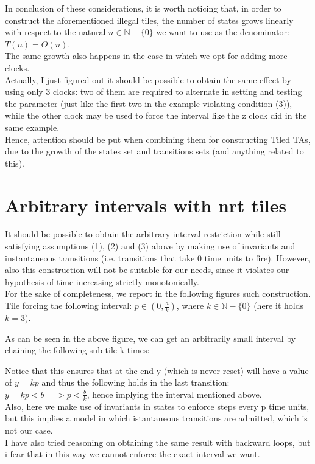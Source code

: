 \documentclass[12pt, a4paper]{article}
\begin{document}
\noindent
In conclusion of these considerations, it is worth noticing that, in order to construct the aforementioned illegal tiles, the number of states grows linearly with respect to the natural $n \in \mathbb{N}-\{0\}$ we want to use as the denominator: $T(n) = \Theta(n)$.\\
The same growth also happens in the case in which we opt for adding more clocks.\\
Actually, I just figured out it should be possible to obtain the same effect by using only 3 clocks: two of them are required to alternate in setting and testing the parameter (just like the first two in the example violating condition (3)), while the other clock may be used to force the interval like the z clock did in the same example.\\
Hence, attention should be put when combining them for constructing Tiled TAs, due to the growth of the states set and transitions sets (and anything related to this).

\newpage

\section{Arbitrary intervals with nrt tiles}

\noindent
It should be possible to obtain the arbitrary interval restriction while still satisfying assumptions (1), (2) and (3) above by making use of invariants and instantaneous transitions (i.e. transitions that take 0 time units to fire). However, also this construction will not be suitable for our needs, since it violates our hypothesis of time increasing strictly monotonically.\\
For the sake of completeness, we report in the following figures such construction.\\

Tile forcing the following interval: $p \in (0, \frac{a}{k})$, where $k \in \mathbb{N}-\{0\}$ (here it holds $k = 3$).



\noindent
As can be seen in the above figure, we can get an arbitrarily small interval by chaining the following sub-tile k times:



\noindent
Notice that this ensures that at the end y (which is never reset) will have a value of $y = kp$ and thus the following holds in the last transition: $y = kp < b => p < \frac{b}{k}$, hence implying the interval mentioned above.\\
Also, here we make use of invariants in states to enforce steps every p time units, but this implies a model in which istantaneous transitions are admitted, which is not our case.\\
I have also tried reasoning on obtaining the same result with backward loops, but i fear that in this way we cannot enforce the exact interval we want.
\end{document}

